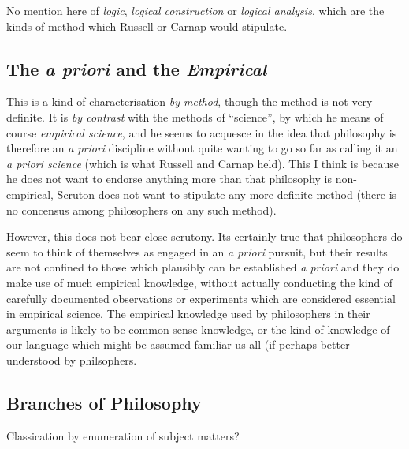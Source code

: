 \documentclass[10pt,titlepage]{article}
\begin{document}
No mention here of {\it logic}, {\it logical construction} or {\it logical analysis}, which are the kinds of method which Russell or Carnap would stipulate.

\subsection{The {\it a priori} and the {\it Empirical}}

This is a kind of characterisation {\it by method}, though the method is not very definite.
It is {\it by contrast} with the methods of ``science'', by which he means of course {\it empirical science}, and he seems to acquesce in the idea that philosophy is therefore an {\it a priori} discipline without quite wanting to go so far as calling it an {\it a priori science} (which is what Russell and Carnap held).
This I think is because he does not want to endorse anything more than that philosophy is non-empirical, Scruton does not want to stipulate any more definite method (there is no concensus among philosophers on any such method).

However, this does not bear close scrutony.
Its certainly true that philosophers do seem to think of themselves as engaged in an {\it a priori} pursuit, but their results are not confined to those which plausibly can be established {\it a priori} and they do make use of much empirical knowledge, without actually conducting the kind of carefully documented observations or experiments which are considered essential in empirical science.
The empirical knowledge used by philosophers in their arguments is likely to be common sense knowledge, or the kind of knowledge of our language which might be assumed familiar us all (if perhaps better understood by philsophers.

\subsection{Branches of Philosophy}

Classication by enumeration of subject matters?
\end{document}
